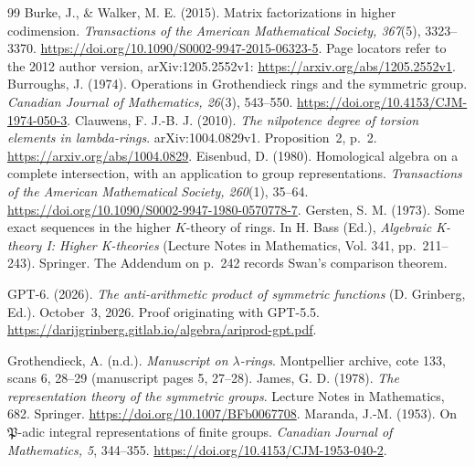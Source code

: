 \documentclass[11pt,a4paper]{article}
\theoremstyle{definition}\newtheorem{definition}[theorem]{Definition}
\theoremstyle{remark}\newtheorem{remark}[theorem]{Remark}
\begin{document}
\begin{thebibliography}{99}
Burke, J., \& Walker, M. E. (2015). Matrix factorizations in higher codimension.
\emph{Transactions of the American Mathematical Society, 367}(5), 3323--3370.
\url{https://doi.org/10.1090/S0002-9947-2015-06323-5}.
Page locators refer to the 2012 author version, arXiv:1205.2552v1:
\url{https://arxiv.org/abs/1205.2552v1}.
Burroughs, J. (1974). Operations in Grothendieck rings and the
symmetric group. \emph{Canadian Journal of Mathematics, 26}(3),
543--550. \url{https://doi.org/10.4153/CJM-1974-050-3}.
Clauwens, F. J.-B. J. (2010). \emph{The nilpotence degree of torsion
elements in lambda-rings}. arXiv:1004.0829v1. Proposition~2, p.~2.
\url{https://arxiv.org/abs/1004.0829}.
Eisenbud, D. (1980). Homological algebra on a complete intersection,
with an application to group representations.
\emph{Transactions of the American Mathematical Society, 260}(1), 35--64.
\url{https://doi.org/10.1090/S0002-9947-1980-0570778-7}.
Gersten, S. M. (1973). Some exact sequences in the higher
$K$-theory of rings. In H. Bass (Ed.),
\emph{Algebraic K-theory I: Higher K-theories}
(Lecture Notes in Mathematics, Vol. 341, pp.~211--243).
Springer. The Addendum on p.~242 records Swan's comparison theorem.

GPT-6. (2026). \emph{The anti-arithmetic product of symmetric functions}
(D. Grinberg, Ed.). October~3, 2026. Proof originating with GPT-5.5.
\url{https://darijgrinberg.gitlab.io/algebra/ariprod-gpt.pdf}.

Grothendieck, A. (n.d.). \emph{Manuscript on $\lambda$-rings}.
Montpellier archive, cote 133, scans 6, 28--29
(manuscript pages 5, 27--28).
James, G. D. (1978). \emph{The representation theory of the
symmetric groups}. Lecture Notes in Mathematics, 682. Springer.
\url{https://doi.org/10.1007/BFb0067708}.
Maranda, J.-M. (1953).
On $\mathfrak P$-adic integral representations of finite groups.
\emph{Canadian Journal of Mathematics, 5}, 344--355.
\url{https://doi.org/10.4153/CJM-1953-040-2}.


\end{thebibliography}
\end{document}
